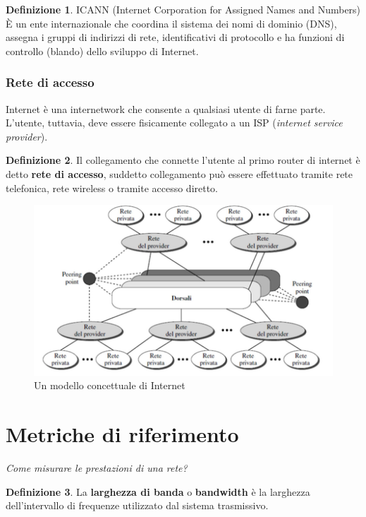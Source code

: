 \documentclass[11pt,a4paper]{article}
\theoremstyle{definition}
\newtheorem{definition}{Definizione}[section]
\begin{document}
\theoremstyle{definition}
\begin{definition}
	ICANN (Internet Corporation for Assigned Names and Numbers) È un ente internazionale che coordina il sistema dei nomi di dominio (DNS), assegna i gruppi di indirizzi di rete, identificativi di protocollo e ha funzioni di controllo (blando) dello sviluppo di Internet.
\end{definition}

\subsubsection{Rete di accesso}
Internet è una internetwork che consente a qualsiasi utente
di farne parte. L’utente, tuttavia, deve essere fisicamente collegato a un
ISP (\textit{internet service provider}).
\theoremstyle{definition}
\begin{definition}
	Il collegamento che connette l'utente al primo router di internet è detto \textbf{rete di accesso}, suddetto collegamento può essere effettuato tramite rete telefonica, rete wireless o tramite accesso diretto.
\end{definition}

\newpage

\begin{figure}[!h]
	\includegraphics[scale=0.85]{Immagini/Internet_Concept.png}
	\centering
	\caption{Un modello concettuale di Internet}
\end{figure}

\section{Metriche di riferimento}
\textit{Come misurare le prestazioni di una rete?}\newline

\theoremstyle{definition}
\begin{definition}
	La \textbf{larghezza di banda} o \textbf{bandwidth} è la larghezza dell'intervallo di frequenze utilizzato dal sistema trasmissivo.
\end{definition}
\end{document}
